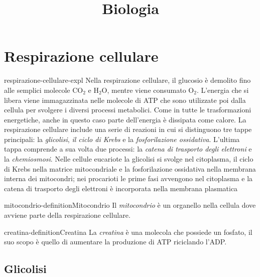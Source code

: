 \documentclass[preview]{standalone}
\begin{document}
\title{Biologia}
\genpage

\section{Respirazione cellulare}

\begin{snippet}{respirazione-cellulare-expl}
    Nella respirazione cellulare, il glucosio è demolito fino alle semplici molecole CO\({}_2\) e H\({}_2\)O,
    mentre viene consumato O\({}_2\). L'energia che si libera viene immagazzinata nelle molecole di
    ATP che sono utilizzate poi dalla cellula per svolgere i diversi processi metabolici. Come in
    tutte le trasformazioni energetiche, anche in questo caso parte dell'energia è dissipata come
    calore. La respirazione cellulare include una serie di reazioni in cui si distinguono tre tappe
    principali: la \textit{glicolisi}, \textit{il ciclo di Krebs} e la \textit{fosforilazione ossidativa}.
    L'ultima tappa comprende a sua volta due processi:
    la \textit{catena di trasporto degli elettroni} e la \textit{chemiosmosi}. Nelle cellule
    eucariote la glicolisi si svolge nel citoplasma, il ciclo di Krebs nella matrice mitocondriale e
    la fosforilazione ossidativa nella membrana interna dei mitocondri; nei procarioti le prime
    fasi avvengono nel citoplasma e la catena di trasporto degli elettroni è incorporata nella
    membrana plasmatica
\end{snippet}


\begin{snippetdefinition}{mitocondrio-definition}{Mitocondrio}
    Il \textit{mitocondrio} è un organello nella cellula dove avviene parte della respirazione cellulare.
\end{snippetdefinition}


\begin{snippetdefinition}{creatina-definition}{Creatina}
    La \textit{creatina} è una molecola che possiede un fosfato, il suo scopo è quello di aumentare la produzione di ATP riciclando l'ADP.
\end{snippetdefinition}

\subsection{Glicolisi}
\end{document}
